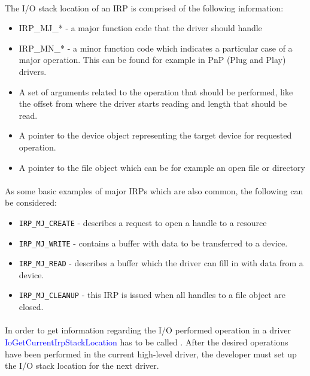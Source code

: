 		\paragraph{}
		The I/O stack location of an IRP is comprised of the following information: \cite{MSDNIOStackLocations}
		\begin{itemize}
			\item IRP\_MJ\_*  - a major function code that the driver should handle
			\item IRP\_MN\_*  - a minor function code which indicates a particular case of a major operation. This can be found for example in PnP (Plug and Play) drivers. 
			\item A set of arguments related to the operation that should be performed, like the offset from where the driver starts reading and length that should be read.
			\item A pointer to the device object representing the target device for requested operation.
			\item A pointer to the file object which can be for example an open file or directory
		\end{itemize}
		
		\paragraph{}
		As some basic examples of major IRPs which are also common, the following can be considered:		
		\begin{itemize}
			\item \texttt{IRP\_MJ\_CREATE} - describes a request to open a handle to a resource
			\item \texttt{IRP\_MJ\_WRITE} - contains a buffer with data to be transferred to a device.
			\item \texttt{IRP\_MJ\_READ} - describes a buffer which the driver can fill in with data from a device.
			\item \texttt{IRP\_MJ\_CLEANUP} - this IRP is issued when all handles to a file object are closed.
		\end{itemize}
	
		\paragraph{}
	   	In order to get information regarding the I/O performed operation in a  driver \textcolor{blue}{IoGetCurrentIrpStackLocation} has to be called . After the desired operations have been performed in the current high-level driver, the developer   must set up the I/O stack location for the next driver. \cite{MSDNIOStackLocations} 
	   
